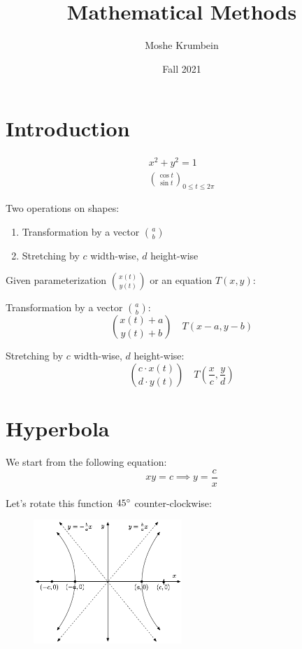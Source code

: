 \documentclass[00_complete]{subfiles}
\title{Mathematical Methods}
\author{Moshe Krumbein}
\date{Fall 2021}
\begin{document}

\section{Introduction}

\begin{example}[Circle]
    
\begin{gather*}
    x^2+y^2=1 \tag{Equation} \\
    \binom{\cos t}{\sin t}_{0 \leq t \leq 2 \pi} \tag{Parametric}
\end{gather*}

\end{example}
Two operations on shapes:
\begin{enumerate} \tightlist
    \item Transformation by a vector $\binom{a}{b}$
    \item Stretching by $c$ width-wise, $d$ height-wise
\end{enumerate}

Given parameterization $\binom{x(t)}{y(t)}$ or an equation $T(x,y)$:

Transformation by a vector $\binom{a}{b}$:
$$\binom{x(t) + a}{y(t) + b} \quad T(x-a, y-b)$$

Stretching by $c$ width-wise, $d$ height-wise:
$$\binom{c \cdot x(t)}{d \cdot y(t)} \quad T\left(\frac{x}{c}, \frac{y}{d}\right)$$

\section{Hyperbola}
We start from the following equation:
$$xy=c \implies y=\frac{c}{x}$$

Let's rotate this function $45 \degree$ counter-clockwise:

\begin{figure}[ht!]
    \centering
      \includegraphics[width=0.5\textwidth]{hyperbola}
\end{figure}
\end{document}
